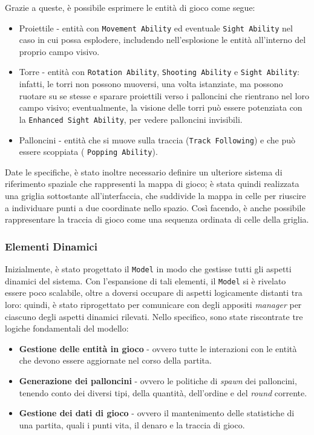 Grazie a queste, è possibile esprimere le entità di gioco come segue:
\begin{itemize}
    \item Proiettile - entità con \texttt{Movement Ability} ed eventuale \texttt{Sight Ability} nel caso in cui possa
    esplodere, includendo nell'esplosione le entità all'interno del proprio campo visivo.
    \item Torre - entità con \texttt{Rotation Ability}, \texttt{Shooting Ability} e \texttt{Sight Ability}: infatti, le
    torri non possono muoversi, una volta istanziate, ma possono ruotare su se stesse e sparare proiettili verso i
    palloncini che rientrano nel loro campo visivo; eventualmente, la visione delle torri può essere potenziata con la
    \texttt{Enhanced Sight Ability}, per vedere palloncini invisibili.
    \item Palloncini - entità che si muove sulla traccia (\texttt{Track Following}) e che può essere scoppiata (
    \texttt{Popping Ability}).
\end{itemize}

Date le specifiche, è stato inoltre necessario definire un ulteriore sistema di riferimento spaziale che rappresenti la
mappa di gioco; è stata quindi realizzata una griglia sottostante all'interfaccia, che suddivide la mappa in celle per
riuscire a individuare punti a due coordinate nello spazio. Così facendo, è anche possibile rappresentare la traccia di
gioco come una sequenza ordinata di celle della griglia.

\subsubsection{Elementi Dinamici}
Inizialmente, è stato progettato il \texttt{Model} in modo che gestisse tutti gli aspetti dinamici del sistema.
Con l'espansione di tali elementi, il \texttt{Model} si è rivelato essere poco scalabile, oltre a doversi occupare di
aspetti logicamente distanti tra loro: quindi, è stato riprogettato per comunicare con degli appositi \textit{manager}
per ciascuno degli aspetti dinamici rilevati. Nello specifico, sono state riscontrate tre logiche fondamentali del
modello:
\begin{itemize}
    \item \textbf{Gestione delle entità in gioco} - ovvero tutte le interazioni con le entità che devono essere
    aggiornate nel corso della partita.
    \item \textbf{Generazione dei palloncini} - ovvero le politiche di \textit{spawn} dei palloncini, tenendo conto dei
    diversi tipi, della quantità, dell'ordine e del \textit{round} corrente.
    \item \textbf{Gestione dei dati di gioco} - ovvero il mantenimento delle statistiche di una partita, quali i punti
    vita, il denaro e la traccia di gioco.
\end{itemize}

